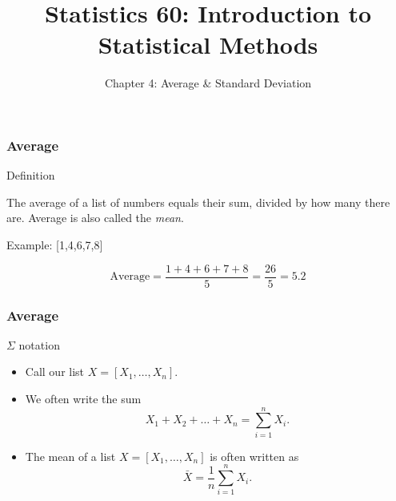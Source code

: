 \documentclass[handout]{beamer}
\title{Statistics 60: Introduction to Statistical Methods}
\subtitle{Chapter 4: Average \& Standard Deviation}
\author{}%
\begin{document}
   \begin{frame}
   \titlepage
   \end{frame}


   \begin{frame} \frametitle{Average}

   \begin{block}
   {Definition}

   The average of a list of numbers equals their sum, divided by how
   many there are. Average is also called the {\em mean}.

   \end{block}

   \begin{block}
   {Example: [1,4,6,7,8]}

   $$
   \text{Average} = \frac{1+4+6+7+8}{5} = \frac{26}{5} = 5.2
   $$

   \end{block}
   \end{frame}


   \begin{frame} \frametitle{Average}

   \begin{block}
   {$\Sigma$ notation}

   \begin{itemize}
   \item Call our list $X=[X_1, \dots, X_n]$.

   \item We often write the sum
   $$X_1 + X_2 + \dots + X_n = \sum_{i=1}^n X_i.$$

   \item The mean of a list $X = [X_1, \dots, X_n]$ is often written as
   $$
   \bar{X} = \frac{1}{n} \sum_{i=1}^n X_i.
   $$
   \end{itemize}
   \end{block}
   \end{frame}

\end{document}
